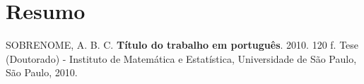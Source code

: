 \documentclass[11pt,twoside,a4paper]{book}
\theoremstyle{plain}
\theoremstyle{definition}
\begin{document}


    
      





\chapter*{{\color{red} Resumo}}

\noindent SOBRENOME, A. B. C. \textbf{Título do trabalho em português}. 
2010. 120 f.
Tese (Doutorado) - Instituto de Matemática e Estatística,
Universidade de São Paulo, São Paulo, 2010.
\\
\end{document}
